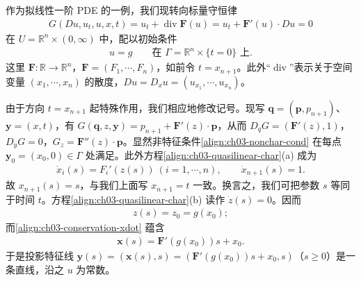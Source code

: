 \documentclass[../../main.tex]{subfiles}
\begin{document}
\begin{example}[守恒律的特征线]\label{example:ch03-conservation-char}作为拟线性一阶 PDE 的一例，我们现转向标量守恒律
\begin{align}\label{align:ch03-conservation}
G(Du,u_t,u,x,t)=u_t+\operatorname{div}\mathbf{F}(u)=u_t+\mathbf{F}'(u)\cdot Du=0
\end{align}
在 $U=\mathbb{R}^n\times(0,\infty)$ 中，配以初始条件
\begin{align}\label{align:ch03-conservation-ic}
u=g \qquad \text{在 }\Gamma=\mathbb{R}^n\times\{t=0\}\text{ 上}.
\end{align}
这里 $\mathbf{F}:\mathbb{R}\to\mathbb{R}^n$，$\mathbf{F}=(F_1,\cdots,F_n)$，如前令 $t=x_{n+1}$。此外``$\operatorname{div}$''表示关于空间变量 $(x_1,\cdots,x_n)$ 的散度，$Du=D_x u=(u_{x_1},\cdots,u_{x_n})$。

由于方向 $t=x_{n+1}$ 起特殊作用，我们相应地修改记号。现写 $\mathbf{q}=(\mathbf{p},p_{n+1})$、$\mathbf{y}=(x,t)$，有 $G(\mathbf{q},z,\mathbf{y})=p_{n+1}+\mathbf{F}'(z)\cdot\mathbf{p}$，从而 $D_q G=(\mathbf{F}'(z),1)$，$D_y G=0$，$G_z=\mathbf{F}''(z)\cdot\mathbf{p}$。显然非特征条件\eqref{align:ch03-nonchar-cond} 在每点 $\mathbf{y}_0=(x_0,0)\in\Gamma$ 处满足。此外方程\eqref{align:ch03-quasilinear-char}(a) 成为
\begin{align}\label{align:ch03-conservation-xdot}
\dot{x}_i(s)=F_i'(z(s)) \ (i=1,\cdots,n),\qquad \dot{x}_{n+1}(s)=1.
\end{align}
故 $x_{n+1}(s)=s$，与我们上面写 $x_{n+1}=t$ 一致。换言之，我们可把参数 $s$ 等同于时间 $t$。方程\eqref{align:ch03-quasilinear-char}(b) 读作 $\dot{z}(s)=0$。因而
\begin{align}\label{align:ch03-conservation-z}
z(s)=z_0=g(x_0);
\end{align}
而\eqref{align:ch03-conservation-xdot} 蕴含
\begin{align}\label{align:ch03-conservation-path}
\mathbf{x}(s)=\mathbf{F}'(g(x_0))s+x_0.
\end{align}
于是投影特征线 $\mathbf{y}(s)=(\mathbf{x}(s),s)=(\mathbf{F}'(g(x_0))s+x_0,s)$（$s\geqslant 0$）是一条直线，沿之 $u$ 为常数。
\end{example}
\end{document}
